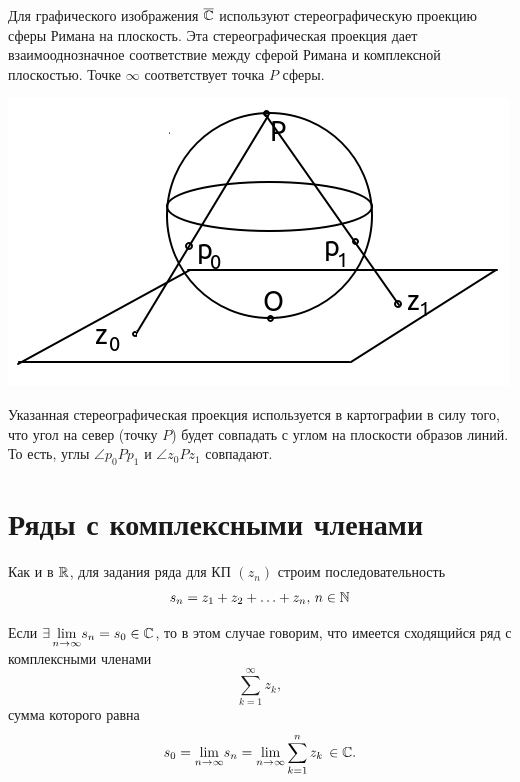 \documentclass[../../main.tex]{subfiles}
\begin{document}
Для графического изображения $ \overline{\mathbb{C}} $ используют стереографическую 
проекцию сферы Римана на плоскость. Эта стереографическая проекция дает 
взаимооднозначное соответствие между сферой Римана и комплексной плоскостью. 
Точке $ \infty $ соответствует точка $P$ сферы.

\begin{center}
	\includegraphics[scale = 0.8]{lec24_1} 
\end{center}

Указанная стереографическая проекция используется в картографии в силу того, 
что угол на север (точку $P$) будет совпадать с углом на плоскости образов 
линий. То есть, углы $\angle p_0Pp_1$ и $\angle z_0Pz_1$ совпадают.

\section{Ряды с комплексными членами}

Как и в $ \mathbb{R} $, для задания ряда для КП $ (z_n) $ строим последовательность 
\begin{equation}\label{24:6}
	s_n = z_1 + z_2 + \ldots + z_n,\, n \in \mathbb{N}
\end{equation}

Если $ \exists\, \underset{n \to \infty}{\lim} s_n = s_0 \in \mathbb{C} $, то в этом 
случае говорим, что имеется сходящийся ряд с комплексными членами
\begin{equation}\label{24:7}
	\sum_{k=1}^{\infty}z_k,
\end{equation}
сумма которого равна
\begin{equation}\label{24:8}
	s_0 = \underset{n \to \infty}{\lim} s_n = \underset{n \to \infty}{\lim} 
	\sum_{k=1}^{n}z_k\, \in \mathbb{C}.
\end{equation}
\end{document}
